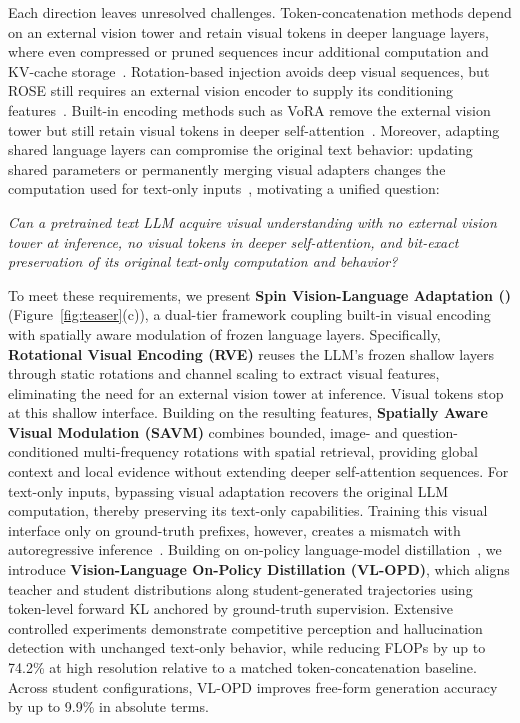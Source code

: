 Each direction leaves unresolved challenges.
Token-concatenation methods depend on an external vision tower and retain
visual tokens in deeper language layers, where even compressed or pruned
sequences incur additional computation and KV-cache
storage~\citep{liu2023llava,chen2024fastv}.
Rotation-based injection avoids deep visual sequences, but ROSE still
requires an external vision encoder to supply its conditioning
features~\citep{rose2025}.
Built-in encoding methods such as VoRA remove the external vision tower
but still retain visual tokens in deeper self-attention~\citep{vora2025}.
Moreover, adapting shared language layers can compromise the original
text behavior: updating shared parameters or permanently merging visual
adapters changes the computation used for text-only
inputs~\citep{diao2024eve,vora2025}, motivating a unified question:

\emph{Can a pretrained text LLM acquire visual understanding with no
external vision tower at inference, no visual tokens in deeper
self-attention, and bit-exact preservation of its original text-only
computation and behavior?}

To meet these requirements, we present
\textbf{Spin Vision-Language Adaptation (\modelname)} (Figure~\ref{fig:teaser}(c)), a dual-tier
framework coupling built-in visual encoding with spatially aware
modulation of frozen language layers.
Specifically, \textbf{Rotational Visual Encoding (RVE)} reuses the LLM's
frozen shallow layers through static rotations and channel scaling to
extract visual features, eliminating the need for an external vision
tower at inference. Visual tokens stop at this shallow interface.
Building on the resulting features,
\textbf{Spatially Aware Visual Modulation (SAVM)} combines bounded,
image- and question-conditioned multi-frequency rotations with spatial
retrieval, providing global context and local evidence without extending
deeper self-attention sequences.
For text-only inputs, bypassing visual adaptation recovers the original
LLM computation, thereby preserving its text-only capabilities.
Training this visual interface only on ground-truth prefixes, however,
creates a mismatch with autoregressive
inference~\citep{bengio2015scheduled}.
Building on on-policy language-model
distillation~\citep{agarwal2024gkd,gu2024minillm}, we introduce
\textbf{Vision-Language On-Policy Distillation (VL-OPD)}, which aligns
teacher and student distributions along student-generated trajectories
using token-level forward KL anchored by ground-truth supervision.
Extensive controlled experiments demonstrate competitive perception
and hallucination detection with unchanged text-only behavior, while
reducing FLOPs by up to 74.2\% at high resolution relative to a matched
token-concatenation baseline.
Across student configurations, VL-OPD improves free-form generation
accuracy by up to 9.9\% in absolute terms.

